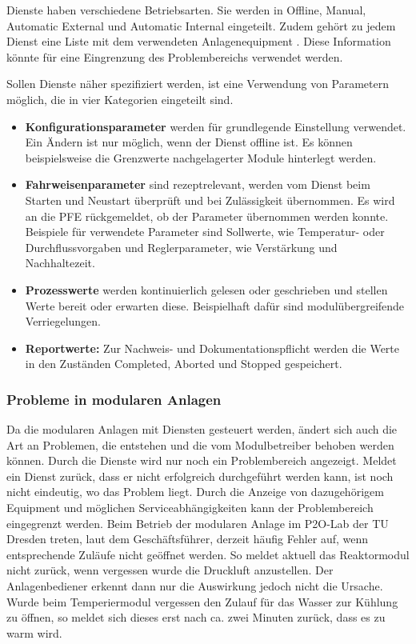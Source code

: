 Dienste haben verschiedene Betriebsarten. Sie werden in Offline, Manual, Automatic External und Automatic Internal eingeteilt. Zudem gehört zu jedem Dienst eine Liste mit dem verwendeten Anlagenequipment \cite{VDI2658-Blatt4}. Diese Information könnte für eine Eingrenzung des Problembereichs verwendet werden.

Sollen Dienste näher spezifiziert werden, ist eine Verwendung von Parametern möglich, die in vier Kategorien eingeteilt sind. \cite{VDI2658-Blatt4}
\begin{itemize}
\item \textbf{Konfigurationsparameter} werden für grundlegende Einstellung verwendet. Ein Ändern ist nur möglich, wenn der Dienst offline ist. Es können beispielsweise die Grenzwerte nachgelagerter Module hinterlegt werden. 
\item \textbf{Fahrweisenparameter} sind rezeptrelevant, werden vom Dienst beim Starten und Neustart überprüft und bei Zulässigkeit übernommen. Es wird an die PFE rückgemeldet, ob der Parameter übernommen werden konnte. Beispiele für verwendete Parameter sind Sollwerte, wie Temperatur- oder Durchflussvorgaben und Reglerparameter, wie Verstärkung und Nachhaltezeit.
\item \textbf{Prozesswerte} werden kontinuierlich gelesen oder geschrieben und stellen Werte bereit oder erwarten diese. Beispielhaft dafür sind modulübergreifende Verriegelungen.
\item \textbf{Reportwerte:} Zur Nachweis- und Dokumentationspflicht werden die Werte in den Zuständen Completed, Aborted und Stopped gespeichert.
\end{itemize}

\subsubsection*{Probleme in modularen Anlagen}
\label{Probleme-modulare-Anlage}
Da die modularen Anlagen mit Diensten gesteuert werden, ändert sich auch die Art an Problemen, die entstehen und die vom Modulbetreiber behoben werden können. Durch die Dienste wird nur noch ein Problembereich angezeigt. Meldet ein Dienst zurück, dass er nicht erfolgreich durchgeführt werden kann, ist noch nicht eindeutig, wo das Problem liegt. Durch die Anzeige von dazugehörigem Equipment und möglichen Serviceabhängigkeiten kann der Problembereich eingegrenzt werden. Beim Betrieb der modularen Anlage im P2O-Lab der TU Dresden treten, laut dem Geschäftsführer, derzeit häufig Fehler auf, wenn entsprechende Zuläufe nicht geöffnet werden. So meldet aktuell das Reaktormodul nicht zurück, wenn vergessen wurde die Druckluft anzustellen. Der Anlagenbediener erkennt dann nur die Auswirkung jedoch nicht die Ursache. Wurde beim Temperiermodul vergessen den Zulauf für das Wasser zur Kühlung zu öffnen, so meldet sich dieses erst nach ca. zwei Minuten zurück, dass es zu warm wird.

